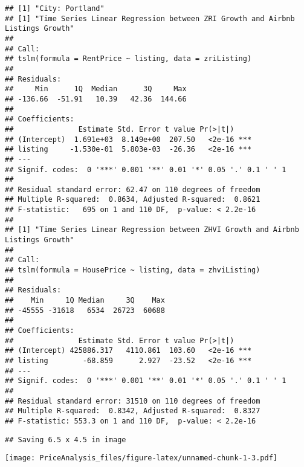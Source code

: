 \documentclass[
]{article}
\begin{document}
\begin{verbatim}
## [1] "City: Portland"
## [1] "Time Series Linear Regression between ZRI Growth and Airbnb Listings Growth"
## 
## Call:
## tslm(formula = RentPrice ~ listing, data = zriListing)
## 
## Residuals:
##     Min      1Q  Median      3Q     Max 
## -136.66  -51.91   10.39   42.36  144.66 
## 
## Coefficients:
##               Estimate Std. Error t value Pr(>|t|)    
## (Intercept)  1.691e+03  8.149e+00  207.50   <2e-16 ***
## listing     -1.530e-01  5.803e-03  -26.36   <2e-16 ***
## ---
## Signif. codes:  0 '***' 0.001 '**' 0.01 '*' 0.05 '.' 0.1 ' ' 1
## 
## Residual standard error: 62.47 on 110 degrees of freedom
## Multiple R-squared:  0.8634, Adjusted R-squared:  0.8621 
## F-statistic:   695 on 1 and 110 DF,  p-value: < 2.2e-16
## 
## [1] "Time Series Linear Regression between ZHVI Growth and Airbnb Listings Growth"
## 
## Call:
## tslm(formula = HousePrice ~ listing, data = zhviListing)
## 
## Residuals:
##    Min     1Q Median     3Q    Max 
## -45555 -31618   6534  26723  60688 
## 
## Coefficients:
##               Estimate Std. Error t value Pr(>|t|)    
## (Intercept) 425886.317   4110.861  103.60   <2e-16 ***
## listing        -68.859      2.927  -23.52   <2e-16 ***
## ---
## Signif. codes:  0 '***' 0.001 '**' 0.01 '*' 0.05 '.' 0.1 ' ' 1
## 
## Residual standard error: 31510 on 110 degrees of freedom
## Multiple R-squared:  0.8342, Adjusted R-squared:  0.8327 
## F-statistic: 553.3 on 1 and 110 DF,  p-value: < 2.2e-16
\end{verbatim}

\begin{verbatim}
## Saving 6.5 x 4.5 in image
\end{verbatim}

\texttt{[image: PriceAnalysis\_files/figure-latex/unnamed-chunk-1-3.pdf]}
\end{document}
